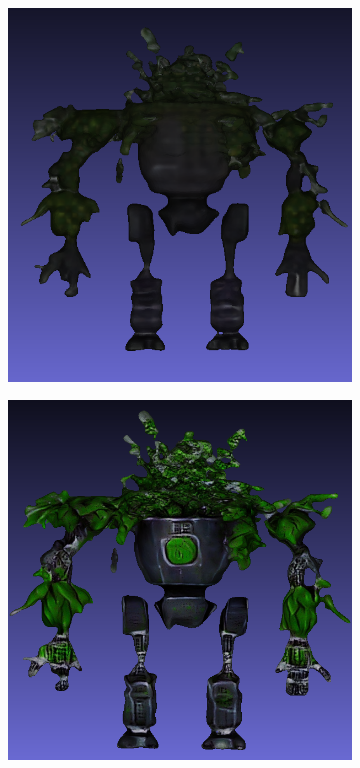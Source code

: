 \begin{figure}[H]
    \centering
    \small
    \begin{subfigure}[b]{0.25\textwidth}
        \centering
        \includegraphics[width=\textwidth]{etc/Genie/plantRobot_coarse.png}
        \caption{}
    \end{subfigure}
    \begin{subfigure}[b]{0.26\textwidth}
        \centering
        \includegraphics[width=\textwidth]{etc/Genie/plantRobot_fine_front.png}

\end{subfigure}
\end{figure}
